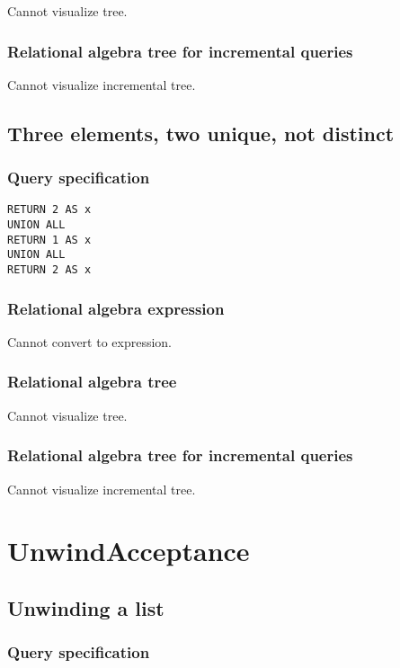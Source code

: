 Cannot visualize tree.

\subsubsection*{Relational algebra tree for incremental queries}

Cannot visualize incremental tree.

\subsection{Three elements, two unique, not distinct}

\subsubsection*{Query specification}

\begin{lstlisting}
RETURN 2 AS x
UNION ALL
RETURN 1 AS x
UNION ALL
RETURN 2 AS x
\end{lstlisting}

\subsubsection*{Relational algebra expression}

Cannot convert to expression.

\subsubsection*{Relational algebra tree}

Cannot visualize tree.

\subsubsection*{Relational algebra tree for incremental queries}

Cannot visualize incremental tree.

\section{UnwindAcceptance}

\subsection{Unwinding a list}

\subsubsection*{Query specification}

